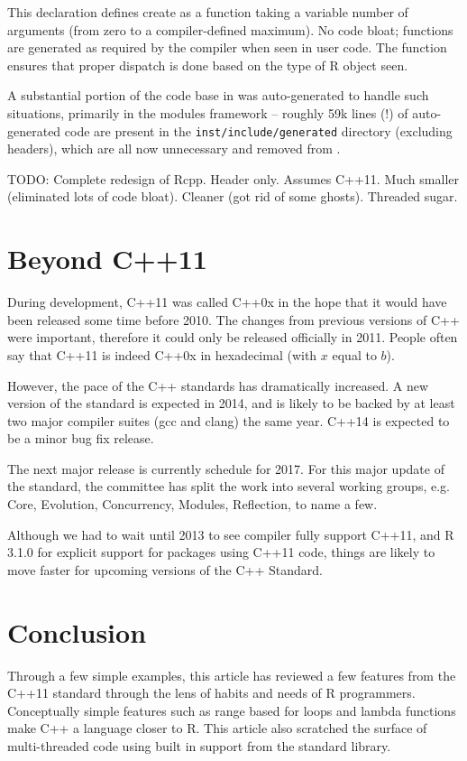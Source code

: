 This declaration defines create as a function taking a variable number of
arguments (from zero to a compiler-defined maximum). No code bloat; functions
are generated as required by the compiler when seen in user code. The
 function ensures that proper dispatch is done based on the
type of R object seen.

A substantial portion of the code base in  was auto-generated to
handle such situations, primarily in the modules framework -- roughly 59k lines (!)
of auto-generated code are present in the \texttt{inst/include/generated}
directory (excluding headers), which are all now unnecessary and removed from
.

TODO:
Complete redesign of Rcpp.
Header only. Assumes C++11.
Much smaller (eliminated lots of code bloat).
Cleaner (got rid of some ghosts).
Threaded sugar.

\section{Beyond C++11}

During development, C++11 was called C++0x in the hope that it would have been
released some time before 2010. The changes from previous versions of C++
were important, therefore it could only be released officially in 2011. People
often say that C++11 is indeed C++0x in hexadecimal (with $x$ equal to $b$).

However, the pace of the C++ standards has dramatically increased. A new version
of the standard is expected in 2014, and is likely to be backed by at least
two major compiler suites (gcc and clang) the same year. C++14 is expected to
be a minor bug fix release.

The next major release is currently schedule for 2017. For this major
update of the standard, the committee has split the work into several
working groups, e.g. Core, Evolution, Concurrency, Modules, Reflection, to name
a few.

Although we had to wait until 2013 to see compiler fully support C++11, and
R 3.1.0 for explicit support for packages using C++11 code, things are likely
to move faster for upcoming versions of the C++ Standard.

\section{Conclusion}

Through a few simple examples, this article has reviewed a few features from
the C++11 standard through the lens of habits and needs of R programmers.
Conceptually simple features such as range based for loops and lambda functions
make C++ a language closer to R. This article also scratched the surface
of multi-threaded code using built in support from the standard library.

